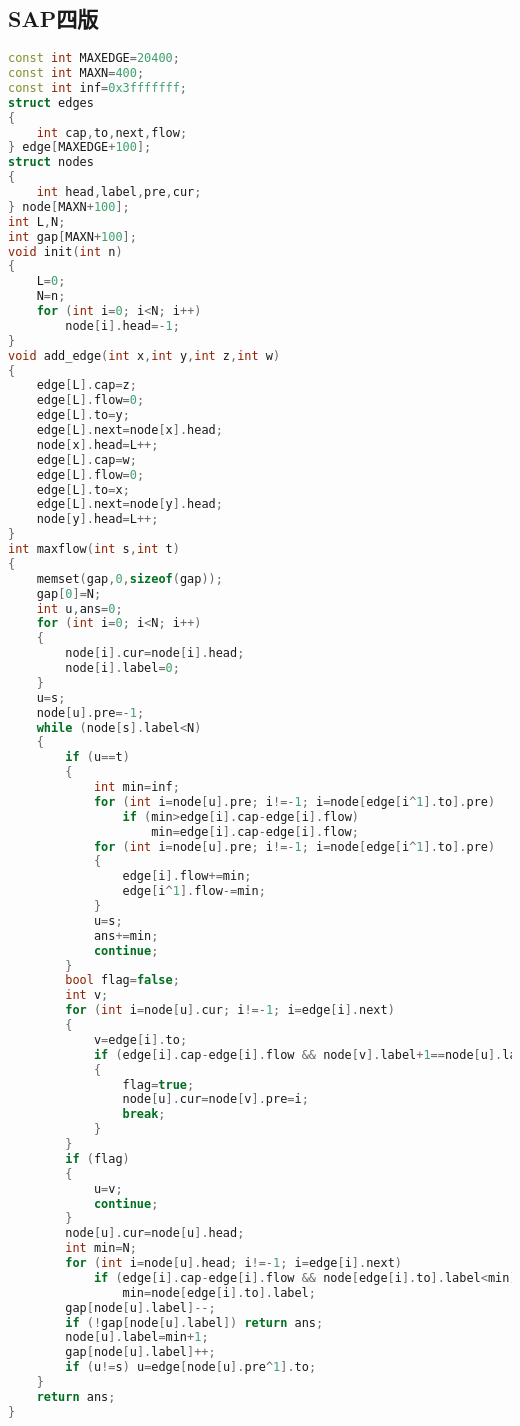 \subsection{SAP四版}
	\begin{lstlisting}[language=c++]
const int MAXEDGE=20400;
const int MAXN=400;
const int inf=0x3fffffff;
struct edges
{
	int cap,to,next,flow;
} edge[MAXEDGE+100];
struct nodes
{
	int head,label,pre,cur;
} node[MAXN+100];
int L,N;
int gap[MAXN+100];
void init(int n)
{
	L=0;
	N=n;
	for (int i=0; i<N; i++)
		node[i].head=-1;
}
void add_edge(int x,int y,int z,int w)
{
	edge[L].cap=z;
	edge[L].flow=0;
	edge[L].to=y;
	edge[L].next=node[x].head;
	node[x].head=L++;
	edge[L].cap=w;
	edge[L].flow=0;
	edge[L].to=x;
	edge[L].next=node[y].head;
	node[y].head=L++;
}
int maxflow(int s,int t)
{
	memset(gap,0,sizeof(gap));
	gap[0]=N;
	int u,ans=0;
	for (int i=0; i<N; i++)
	{
		node[i].cur=node[i].head;
		node[i].label=0;
	}
	u=s;
	node[u].pre=-1;
	while (node[s].label<N)
	{
		if (u==t)
		{
			int min=inf;
			for (int i=node[u].pre; i!=-1; i=node[edge[i^1].to].pre)
				if (min>edge[i].cap-edge[i].flow)
					min=edge[i].cap-edge[i].flow;
			for (int i=node[u].pre; i!=-1; i=node[edge[i^1].to].pre)
			{
				edge[i].flow+=min;
				edge[i^1].flow-=min;
			}
			u=s;
			ans+=min;
			continue;
		}
		bool flag=false;
		int v;
		for (int i=node[u].cur; i!=-1; i=edge[i].next)
		{
			v=edge[i].to;
			if (edge[i].cap-edge[i].flow && node[v].label+1==node[u].label)
			{
				flag=true;
				node[u].cur=node[v].pre=i;
				break;
			}
		}
		if (flag)
		{
			u=v;
			continue;
		}
		node[u].cur=node[u].head;
		int min=N;
		for (int i=node[u].head; i!=-1; i=edge[i].next)
			if (edge[i].cap-edge[i].flow && node[edge[i].to].label<min)
				min=node[edge[i].to].label;
		gap[node[u].label]--;
		if (!gap[node[u].label]) return ans;
		node[u].label=min+1;
		gap[node[u].label]++;
		if (u!=s) u=edge[node[u].pre^1].to;
	}
	return ans;
}
	\end{lstlisting}